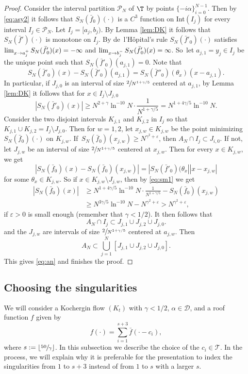 \documentclass[10pt]{amsart}
\let\DS\relax
\newcommand\cD{\mathcal{D}}
\newcommand\cP{\mathcal{P}}
\newcommand\cT{\mathcal{T}}
\let\eps\varepsilon
\theoremstyle{definition}
\theoremstyle{plain}
\begin{document}
\begin{proof}
Consider the interval partition $\cP_N$ of $\T$ by points $\{-i\alpha\}_{i=0}^{N-1}$. Then by \eqref{eq:asy2} it follows that $S_N(\bar{f}_0)(\cdot)$ is a $C^3$ function on Int$(I_j)$ for every interval $I_j\in \cP_N$. Let $I_j=[a_j,b_j)$. By Lemma \ref{lem:DK} it follows that $S_N(\bar{f}{}')(\cdot)$ is monotone on $I_j$. By de~l'Hôpital's rule
$S_N(\bar{f}{}'_0)(\cdot)$ satisfies $\DS \lim_{x\to a_j^+}S_N(\bar{f}{}'_0)(x)=-\infty$ and
$\DS \lim_{x\to b_j^-}S_N(\bar{f}{}'_0)(x)=\infty$. So~let $a_{j,1}=y_j\in I_j$ be the unique
point such that $S_N(\bar{f}{}'_0)(a_{j,1})=0$. Note that
\[
S_N(\bar{f}{}'_0)(x)-S_N(\bar{f}{}'_0)(a_{j,1})=S_N(\bar{f}{}''_0)(\theta_x)(x-a_{j,1}).
\]
In particular, if $J_{j,0}$ is an interval of size $\sfrac{2}{N^{1+\gamma/5}}$ centered at $a_{j,1}$, by Lemma \ref{lem:DK} it follows that for $x\in I_j\setminus J_{j,0}$
\begin{equation}\label{eq:sm1}
|S_N(\bar{f}{}'_0)(x)|\geq N^{2+\gamma}\ln^{-10}N \cdot \frac{1}{N^{1+\gamma/5}}= N^{1+4\gamma/5}\ln^{-10}N.
\end{equation}
Consider the two disjoint intervals $K_{j,1}$ and $K_{j,2}$ in $I_j$ so that $K_{j,1}\cup K_{j,2}=I_j\setminus J_{j,0}$. Then for $w=1,2$, let $x_{j,w}\in K_{j,w}$ be the point minimizing $S_N(\bar{f}_0)(\cdot)$ on $K_{j,w}$. If~$S_N(\bar{f}_0)(x_{j,w})\geq N^{\gamma^2+\eps}$, then $A_N\cap I_j\subset J_{i,0}$. If not, let $J_{j,w}$ be an interval of size $\sfrac{2}{N^{1+\gamma/5}}$ centered at $x_{j,w}$. Then for every $x\in K_{j,w}$, we get
\[
|S_N(\bar{f}_0)(x)-S_N(\bar{f}_0)(x_{j,w})|=|S_N(\bar{f}{}'_0)(\theta_x||x-x_{j,w}|
\]
for some $\theta_x\in K_{j,w}$. So if $x\in K_{j,w}\setminus J_{j,w}$, then by \eqref{eq:sm1} we get
\begin{align*}
|S_N(\bar{f}_0)(x)|&\geq N^{1+4\gamma/5}\ln^{-10}N\cdot \frac{1}{N^{1+\gamma/5}}- S_N(\bar{f}_0)(x_{j,w})\\
&\geq N^{3\gamma/5}\ln^{-10}N -N^{\gamma^2+\eps}>N^{\gamma^2+\eps},
\end{align*}
if $\eps>0$ is small enough (remember that $\gamma<1/2$). It then follows that
\[
A_N\cap I_j\subset J_{j,1}\cup J_{j,2}\cup J_{j,0}.
\]
and the $J_{j,w}$ are intervals of size $\sfrac{2}{N^{1+\gamma/5}}$ centered at $a_{j,w}$. Then
\[
A_N\subset \bigcup_{j=1}^N[J_{j,1}\cup J_{j,2}\cup J_{j,0}].
\]
This gives \eqref{eq:an} and finishes the proof.
\end{proof}

\subsection{Choosing the singularities} \label{sec.singularities}
We will consider a Kochergin flow $(K_t)$ with $\gamma<1/2$, $\alpha\in \cD$, and a roof function $f$ given by
\begin{equation*}%
f(\cdot)=\sum_{i=1}^{s+3} \bar{f}(\cdot-c_i),
\end{equation*}
where $s:=\lfloor \sfrac{50}{\gamma} \rfloor$. In this subsection we describe the choice of the $c_i\in \cT$.
In the process, we will explain why it is preferable for the presentation to index the singularities from $1$ to $s+3$ instead of from $1$ to $s$ with a larger $s$.
\end{document}
